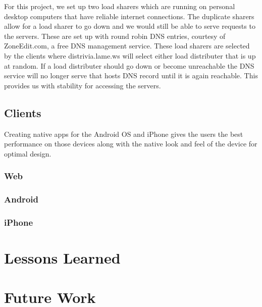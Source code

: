 \documentclass{dependencies/acm_proc_article-sp}
\begin{document}
For this project, we set up two load sharers which are running on personal desktop computers that have reliable internet connections.
The duplicate sharers allow for a load sharer to go down and we would still be able to serve requests to the servers. 
These are set up with round robin DNS entries, courtesy of ZoneEdit.com, a free DNS management service.
These load sharers are selected by the clients where distrivia.lame.ws will select either load distributer that is up at random. 
If a load distributer should go down or become unreachable the DNS service will no longer serve that hosts DNS record until it is again reachable.
This provides us with stability for accessing the servers.

\subsection{Clients}
Creating native apps for the Android OS and iPhone gives the users the best performance on those devices along with the native look and feel of the device for optimal design.
\subsubsection{Web}

\subsubsection{Android}

\subsubsection{iPhone}

\section{Lessons Learned}

\section{Future Work}

\newpage
%

%
%
\balancecolumns
\end{document}
